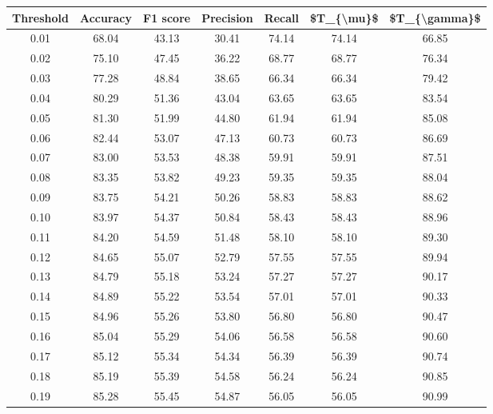 \begin{tabular}{|c|c|c|c|c|c|c|}
\toprule
 Threshold &  Accuracy &  F1 score &  Precision &  Recall &  \$T\_\{\textbackslash mu\}\$ &  \$T\_\{\textbackslash gamma\}\$ \\
\hline
      0.01 &     68.04 &     43.13 &      30.41 &   74.14 &      74.14 &         66.85 \\
      0.02 &     75.10 &     47.45 &      36.22 &   68.77 &      68.77 &         76.34 \\
      0.03 &     77.28 &     48.84 &      38.65 &   66.34 &      66.34 &         79.42 \\
      0.04 &     80.29 &     51.36 &      43.04 &   63.65 &      63.65 &         83.54 \\
      0.05 &     81.30 &     51.99 &      44.80 &   61.94 &      61.94 &         85.08 \\
      0.06 &     82.44 &     53.07 &      47.13 &   60.73 &      60.73 &         86.69 \\
      0.07 &     83.00 &     53.53 &      48.38 &   59.91 &      59.91 &         87.51 \\
      0.08 &     83.35 &     53.82 &      49.23 &   59.35 &      59.35 &         88.04 \\
      0.09 &     83.75 &     54.21 &      50.26 &   58.83 &      58.83 &         88.62 \\
      0.10 &     83.97 &     54.37 &      50.84 &   58.43 &      58.43 &         88.96 \\
      0.11 &     84.20 &     54.59 &      51.48 &   58.10 &      58.10 &         89.30 \\
      0.12 &     84.65 &     55.07 &      52.79 &   57.55 &      57.55 &         89.94 \\
      0.13 &     84.79 &     55.18 &      53.24 &   57.27 &      57.27 &         90.17 \\
      0.14 &     84.89 &     55.22 &      53.54 &   57.01 &      57.01 &         90.33 \\
      0.15 &     84.96 &     55.26 &      53.80 &   56.80 &      56.80 &         90.47 \\
      0.16 &     85.04 &     55.29 &      54.06 &   56.58 &      56.58 &         90.60 \\
      0.17 &     85.12 &     55.34 &      54.34 &   56.39 &      56.39 &         90.74 \\
      0.18 &     85.19 &     55.39 &      54.58 &   56.24 &      56.24 &         90.85 \\
      0.19 &     85.28 &     55.45 &      54.87 &   56.05 &      56.05 &         90.99 \\

\end{tabular}
